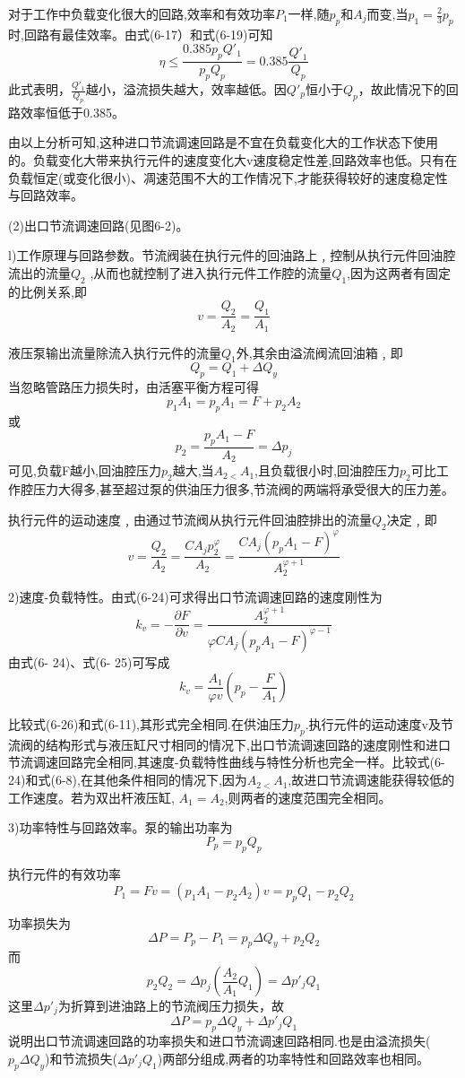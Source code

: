 
对于工作中负载变化很大的回路,效率和有效功率$P_1$一样,随$p_p$和$A_j$而变,当$p_1=\frac{2}{3}p_p$时,回路有最佳效率。由式(6-17）和式(6-19)可知
$$
\eta \le \frac{0.385p_pQ'_1}{p_pQ_p}=0.385\frac{Q'_1}{Q_p}
$$
此式表明，$\frac{Q'_1}{Q_p}$越小，溢流损失越大，效率越低。因$Q'_p$恒小于$Q_p$，故此情况下的回路效率恒低于0.385。

由以上分析可知,这种进口节流调速回路是不宜在负载变化大的工作状态下使用的。负载变化大带来执行元件的速度变化大v速度稳定性差,回路效率也低。只有在负载恒定(或变化很小)、凋速范围不大的工作情况下,才能获得较好的速度稳定性与回路效率。

(2)出口节流调速回路(见图6-2)。

l)工作原理与回路参数。节流阀装在执行元件的回油路上﹐控制从执行元件回油腔流出的流量$Q_2$ ,从而也就控制了进入执行元件工作腔的流量$Q_1$,因为这两者有固定的比例关系,即
$$
v=\frac{Q_2}{A_2}=\frac{Q_1}{A_1}
$$

液压泵输出流量除流入执行元件的流量$Q_1$外,其余由溢流阀流回油箱﹐即
$$
Q_p=Q_1+\varDelta Q_y
$$
当忽略管路压力损失时，由活塞平衡方程可得
$$
p_1A_1=p_pA_1=F+p_2A_2
$$
或
$$
p_2=\frac{p_pA_1-F}{A_2}=\varDelta p_j
$$
可见,负载F越小,回油腔压力$p_2$越大,当$A_{2<}A_1$,且负载很小时,回油腔压力$p_2$可比工作腔压力大得多,甚至超过泵的供油压力很多,节流阀的两端将承受很大的压力差。

执行元件的运动速度﹐由通过节流阀从执行元件回油腔排出的流量$Q_2$决定﹐即
$$
v=\frac{Q_2}{A_2}=\frac{CA_jp_{2}^{\varphi}}{A_2}=\frac{CA_j\left( p_pA_1-F \right) ^{\varphi}}{A_{2}^{\varphi +1}}
$$

2)速度-负载特性。由式(6-24)可求得出口节流调速回路的速度刚性为
$$
k_v=-\frac{\partial F}{\partial v}=\frac{A_{2}^{\varphi +1}}{\varphi CA_j\left( p_pA_1-F \right) ^{\varphi -1}}
$$
由式(6- 24)、式(6- 25)可写成
$$
k_v=\frac{A_1}{\varphi v}\left( p_p-\frac{F}{A_1} \right) 
$$

比较式(6-26)和式(6-11),其形式完全相同.在供油压力$p_p$.执行元件的运动速度v及节流阀的结构形式与液压缸尺寸相同的情况下,出口节流调速回路的速度刚性和进口节流调速回路完全相同,其速度-负载特性曲线与特性分析也完全一样。比较式(6-24)和式(6-8),在其他条件相同的情况下,因为$A_{2<}A_1$,故进口节流调速能获得较低的工作速度。若为双出杆液压缸, $A_1=A_2$,则两者的速度范围完全相同。

3)功率特性与回路效率。泵的输出功率为
$$
P_p=p_pQ_p
$$

执行元件的有效功率
$$
P_1=Fv=\left( p_1A_1-p_2A_2 \right) v=p_pQ_1-p_2Q_2
$$

功率损失为
$$
\varDelta P=P_p-P_1=p_p\varDelta Q_y+p_2Q_2
$$
而$$
p_2Q_2=\varDelta p_j\left( \frac{A_2}{A_1}Q_1 \right) =\varDelta p'_jQ_1
$$
这里$\varDelta p'_j$为折算到进油路上的节流阀压力损失，故
$$
\varDelta P=p_p\varDelta Q_y+\varDelta p'_jQ_1
$$
说明出口节流调速回路的功率损失和进口节流调速回路相同.也是由溢流损失($p_p\varDelta Q_y$)和节流损失($\varDelta p'_jQ_1$)两部分组成,两者的功率特性和回路效率也相同。

